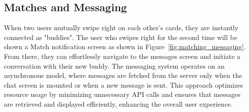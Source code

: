 \subsection{Matches and Messaging}
When two users mutually swipe right on each other's cards, they are instantly connected as "buddies". The user who swipes right for the second time will be shown a Match notification screen as shown in Figure~\ref{fig:matching_messaging}. From there, they can effortlessly navigate to the messages screen and initiate a conversation with their new buddy. The messaging system operates on an asynchronous model, where messages are fetched from the server only when the chat screen is mounted or when a new message is sent. This approach optimizes resource usage by minimizing unnecessary API calls and ensures that messages are retrieved and displayed efficiently, enhancing the overall user experience.
